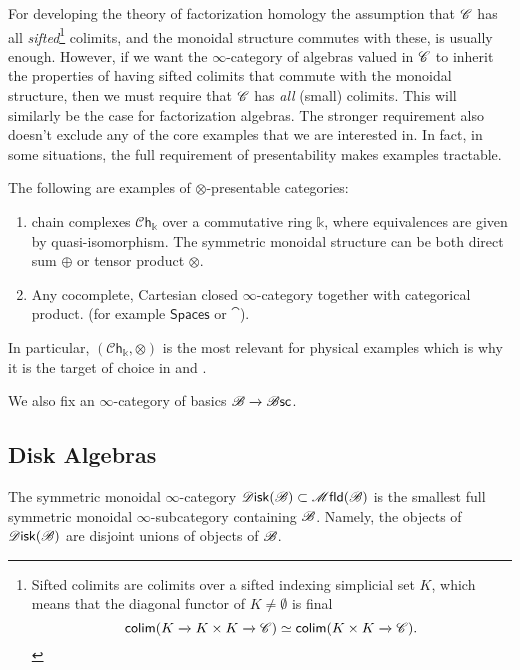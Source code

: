 \documentclass[../text]{subfiles}
\begin{document}
\begin{remark}
    For developing the theory of factorization homology the assumption that $\mathscr{C}$ has all \emph{sifted}\footnote{Sifted colimits are colimits over a sifted indexing simplicial set $K$, which means that the diagonal functor of $K \neq \emptyset$ is final \[ \mathsf{colim}(K \xrightarrow{} K \times K \xrightarrow{} \mathscr{C}) \simeq \mathsf{colim}(K \times K \xrightarrow{} \mathscr{C}).\]} colimits, and the monoidal structure commutes with these, is usually enough. However, if we want the $\infty$-category of algebras valued in $\mathscr{C}$ to inherit the properties of having sifted colimits that commute with the monoidal structure, then we must require that $\mathscr{C}$ has \emph{all} (small) colimits. This will similarly be the case for factorization algebras. The stronger requirement also doesn't exclude any of the core examples that we are interested in. In fact, in some situations, the full requirement of presentability makes examples tractable.
\end{remark}

\begin{example}
    The following are examples of $\otimes$-presentable categories:
    \begin{enumerate}
        \item chain complexes $\mathscr{C}\mathsf{h}_{\mathbb{k}}$ over a commutative ring $\mathbb{k}$, where equivalences are given by quasi-isomorphism. The symmetric monoidal structure can be both direct sum $\oplus$ or tensor product $\otimes$.
        \item Any cocomplete, Cartesian closed $\infty$-category together with categorical product. (for example $\mathsf{Spaces}$ or $\cat$).
    \end{enumerate}
    In particular, $(\mathscr{C}\mathsf{h}_{\mathbb{k}}, \otimes)$ is the most relevant for physical examples which is why it is the target of choice in \cite{cg2016} and \cite{ginot2015}.
\end{example}

We also fix an $\infty$-category of basics $\mathscr{B} \xrightarrow{} \mathscr{B} \mathsf{sc}$.



\subsection{Disk Algebras}

\begin{definition}
    The symmetric monoidal $\infty$-category $\disk(\bstr) \subset \mfld(\bstr)$ is the smallest full symmetric monoidal $\infty$-subcategory containing $\mathscr{B}$. Namely, the objects of $\disk(\bstr)$ are disjoint unions of objects of $\mathscr{B}$.
\end{definition}
\end{document}
